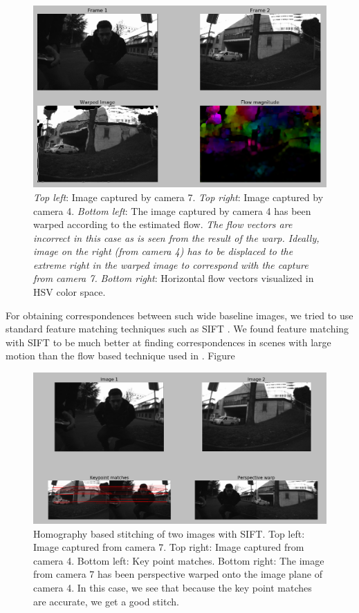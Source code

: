 \documentclass[10pt,twocolumn,letterpaper]{article}
\begin{document}
\begin{figure}
\centering
\includegraphics[width=\linewidth]{../results/optical-flow/cam7-cam4-bad.png}
\caption{\textit{Top left}:  Image captured by camera 7. \textit{Top right}: Image captured by camera 4. \textit{Bottom left}: The image captured by camera 4 has been warped according to the estimated flow. \emph{The flow vectors are incorrect in this case as is seen from the result of the warp. Ideally, image on the right (from camera 4) has to be displaced to the extreme right in the warped image to correspond with the capture from camera 7.} \textit{Bottom right}: Horizontal flow vectors visualized in HSV color space.}
\label{fig:optical-flow-74}
\end{figure}

For obtaining correspondences between such wide baseline images, we tried to use standard feature matching techniques such as SIFT \cite{sift}. We found feature matching with SIFT to be much better at finding correspondences in scenes with large motion than the flow based technique used in \cite{jump16}. Figure \

\begin{figure}
\centering
\includegraphics[width=\linewidth]{../results/homography-stitch/cam7-cam4-good.png}
\caption{Homography based stitching of two images with SIFT. Top left: Image captured from camera 7. Top right: Image captured from camera 4. Bottom left: Key point matches. Bottom right: The image from camera 7 has been perspective warped onto the image plane of camera 4. In this case, we see that because the key point matches are accurate, we get a good stitch.}
\label{fig:homo-74}
\end{figure}
\end{document}
